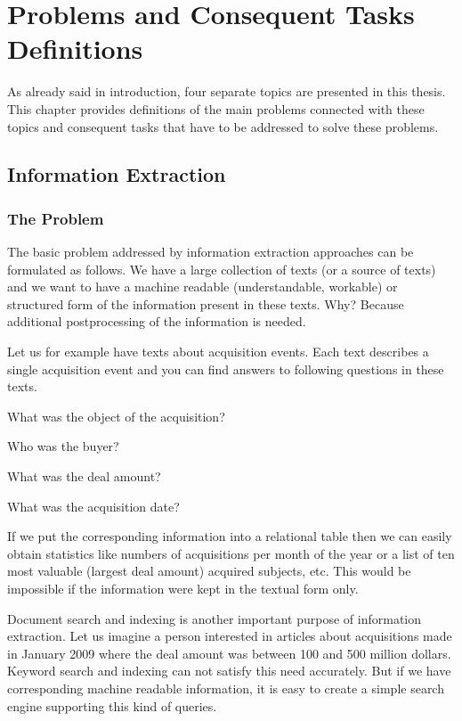 \chapter{Problems and Consequent Tasks Definitions}

As already said in introduction, four separate topics are presented in this thesis. This chapter provides definitions of the main problems connected with these topics and consequent tasks that have to be addressed to solve these problems.

\section{Information Extraction}

\subsection{The Problem}

The basic problem addressed by information extraction approaches can be formulated as follows. We have a large collection of texts (or a source of texts) and we want to have a machine readable (understandable, workable) or structured form of the information present in these texts. Why? Because additional postprocessing of the information is needed.

Let us for example have texts about acquisition events. Each text describes a single acquisition event and you can find answers to following questions in these texts. 

What was the object of the acquisition? 

Who was the buyer? 

What was the deal amount?

What was the acquisition date?

If we put the corresponding information into a relational table then we can easily obtain statistics like numbers of acquisitions per month of the year or a list of ten most valuable (largest deal amount) acquired subjects, etc. This would be impossible if the information were kept in the textual form only.

Document search and indexing is another important purpose of information extraction. Let us imagine a person interested in articles about acquisitions made in January 2009 where the deal amount was between 100 and 500 million dollars.  Keyword search and indexing can not satisfy this need accurately. But if we have corresponding machine readable information, it is easy to create a simple search engine supporting this kind of queries.

